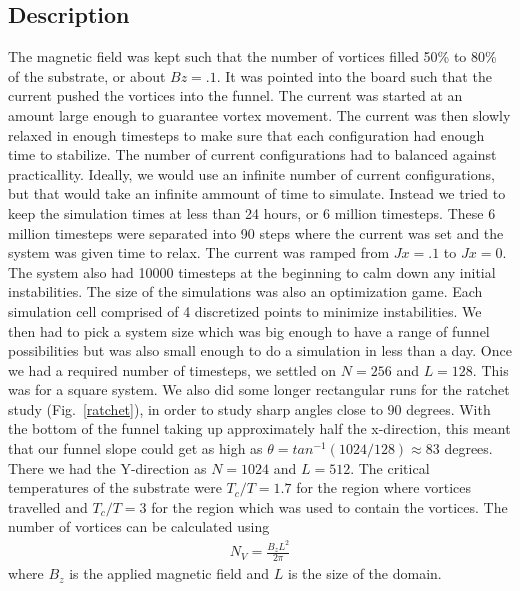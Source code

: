 \subsection{Description}
The magnetic field was kept such that the number of vortices filled 50\% to 80\% of the substrate, or about $Bz=.1$. It was pointed into the board such that the current pushed the vortices into the funnel. The current was started at an amount large enough to guarantee vortex movement. The current was then slowly relaxed in enough timesteps to make sure that each configuration had enough time to stabilize. The number of current configurations had to balanced against practicallity. Ideally, we would use an infinite number of current configurations, but that would take an infinite ammount of time to simulate. Instead we tried to keep the simulation times at less than 24 hours, or 6 million timesteps. These 6 million timesteps were separated into 90 steps where the current was set and the system was given time to relax. The current was ramped from $Jx = .1$ to $Jx = 0$. The system also had 10000 timesteps at the beginning to calm down any initial instabilities. The size of the simulations was also an optimization game. Each simulation cell comprised of 4 discretized points to minimize instabilities. We then had to pick a system size which was big enough to have a range of funnel possibilities but was also small enough to do a simulation in less than a day. Once we had a required number of timesteps, we settled on $N=256$ and $L=128$. This was for a square system. We also did some longer rectangular runs for the ratchet study (Fig.~\ref{ratchet}), in order to study sharp angles close to $90$ degrees. With the bottom of the funnel taking up approximately half the x-direction, this meant that our funnel slope could get as high as $\theta = tan^{-1}(1024/128) \approx 83$ degrees. There we had the Y-direction as $N=1024$ and $L=512$.  The critical temperatures of the substrate were $T_c/T=1.7$ for the region where vortices travelled and $T_c/T=3$ for the region which was used to contain the vortices. The number of vortices can be calculated using 
\begin{eqnarray}
N_V = \frac {B_z L^2} {2 \pi}
\label{numVortices}
\end{eqnarray}
where $B_z$ is the applied magnetic field and $L$ is the size of the domain.

